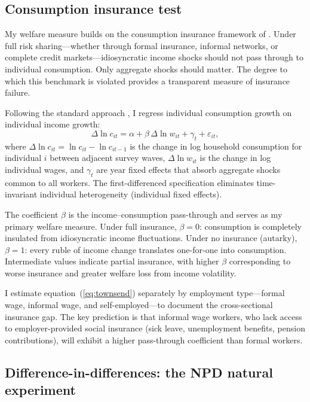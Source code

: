 \documentclass[12pt]{article}
\begin{document}
\subsection{Consumption insurance test}

My welfare measure builds on the consumption insurance framework of \citet{Townsend1994}. Under full risk sharing---whether through formal insurance, informal networks, or complete credit markets---idiosyncratic income shocks should not pass through to individual consumption. Only aggregate shocks should matter. The degree to which this benchmark is violated provides a transparent measure of insurance failure.

Following the standard approach \citep{Cochrane1991, Mace1991, Townsend1994}, I regress individual consumption growth on individual income growth:
\begin{equation}\label{eq:townsend}
\Delta \ln c_{it} = \alpha + \beta \, \Delta \ln w_{it} + \gamma_t + \varepsilon_{it},
\end{equation}
where $\Delta \ln c_{it} = \ln c_{it} - \ln c_{it-1}$ is the change in log household consumption for individual $i$ between adjacent survey waves, $\Delta \ln w_{it}$ is the change in log individual wages, and $\gamma_t$ are year fixed effects that absorb aggregate shocks common to all workers. The first-differenced specification eliminates time-invariant individual heterogeneity (individual fixed effects).

The coefficient $\beta$ is the income--consumption pass-through and serves as my primary welfare measure. Under full insurance, $\beta = 0$: consumption is completely insulated from idiosyncratic income fluctuations. Under no insurance (autarky), $\beta = 1$: every ruble of income change translates one-for-one into consumption. Intermediate values indicate partial insurance, with higher $\beta$ corresponding to worse insurance and greater welfare loss from income volatility.

I estimate equation~(\ref{eq:townsend}) separately by employment type---formal wage, informal wage, and self-employed---to document the cross-sectional insurance gap. The key prediction is that informal wage workers, who lack access to employer-provided social insurance (sick leave, unemployment benefits, pension contributions), will exhibit a higher pass-through coefficient than formal workers.

\subsection{Difference-in-differences: the NPD natural experiment}
\end{document}
